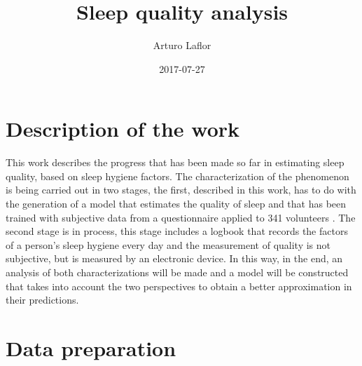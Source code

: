 \documentclass[]{book}
\title{Sleep quality analysis}
\author{Arturo Laflor}
\date{2017-07-27}
\begin{document}
\maketitle

{
\setcounter{tocdepth}{1}
\tableofcontents
}
\chapter{Description of the work}\label{description-of-the-work}

This work describes the progress that has been made so far in estimating
sleep quality, based on sleep hygiene factors. The characterization of
the phenomenon is being carried out in two stages, the first, described
in this work, has to do with the generation of a model that estimates
the quality of sleep and that has been trained with subjective data from
a questionnaire applied to 341 volunteers . The second stage is in
process, this stage includes a logbook that records the factors of a
person's sleep hygiene every day and the measurement of quality is not
subjective, but is measured by an electronic device. In this way, in the
end, an analysis of both characterizations will be made and a model will
be constructed that takes into account the two perspectives to obtain a
better approximation in their predictions.

\chapter{Data preparation}\label{dataprep}
\end{document}
